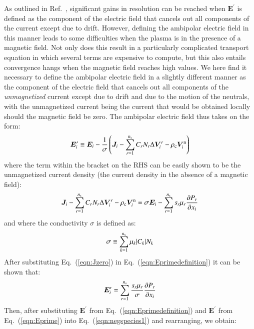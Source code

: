 \documentclass{warpdoc}
\newcommand{\mfd}{\displaystyle}
\newcommand{\ns}{{n_{\rm s}}}
\renewcommand{\vec}[1]{\bm{#1}}
\begin{document}
As outlined in Ref.\ \cite{jcp:2014:parent}, significant gains in resolution can be reached when $\vec{E}^\prime$ is defined as the component of the electric field that cancels out all components of the current except due to drift. However, defining the ambipolar electric field  in this manner leads to some difficulties when the plasma is in the presence of a magnetic field. Not only does this result in a particularly complicated transport equation in which several terms are expensive to compute, but this  also entails convergence hangs when the magnetic field reaches high values. We here find it necessary to define the ambipolar electric field in a slightly different manner as the component of the electric field that cancels out all components of the \emph{unmagnetized} current except due to drift and due to the motion of the neutrals, with the unmagnetized current being the current that would be obtained locally should the magnetic field be zero. The ambipolar electric field thus takes on the form:
%
\begin{equation}
 \vec{E}_i^\prime \equiv \vec{E}_i - \frac{1}{\sigma} \left(\vec{J}_i-\sum_{r=1}^\ns C_r N_r \Delta \vec{V}_i^r -\rho_{\rm c} \vec{V}_i^{\rm n} \right)
 \label{eqn:Eprimedefinition}
\end{equation}
%
where the term within the bracket on the RHS can be easily shown to be the unmagnetized current density (the current density in the absence of a magnetic field):
%
\begin{equation}
\mfd  \vec{J}_i-\sum_{r=1}^\ns C_r N_r \Delta \vec{V}_i^r  - \rho_{\rm c} \vec{V}_i^{\rm n} =   \sigma \vec{E}_i 
             -  \sum_{r=1}^\ns s_r \mu_r  \frac{\partial P_r}{\partial x_i}
\label{eqn:Jzero}
\end{equation}
%
and where the conductivity $\sigma$ is defined as:
%
\begin{equation}
  \sigma \equiv \sum_{k=1}^\ns \mu_k |C_k| N_k 
\end{equation}
%
After substituting Eq.\ (\ref{eqn:Jzero}) in Eq.\ (\ref{eqn:Eprimedefinition}) it can be shown that:
%
\begin{equation}
   \vec{E}_i^\prime =   
   \sum_{r=1}^\ns \frac{s_r \mu_r }{\sigma}  \frac{\partial P_r}{\partial x_i}
\label{eqn:Eprime}
\end{equation}
%
Then, after substituting $\vec{E}^\prime$ from Eq.\ (\ref{eqn:Eprimedefinition}) and $\vec{E}^\prime$ from Eq.\ (\ref{eqn:Eprime}) into Eq.\ (\ref{eqn:negspecies1}) and rearranging, we obtain:
%
\end{document}
